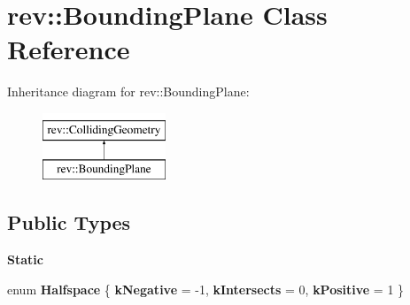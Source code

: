 \hypertarget{classrev_1_1_bounding_plane}{}\section{rev\+::Bounding\+Plane Class Reference}
\label{classrev_1_1_bounding_plane}
Inheritance diagram for rev\+::Bounding\+Plane\+:\begin{figure}[H]
\begin{center}
\leavevmode
\includegraphics[height=2.000000cm]{classrev_1_1_bounding_plane}
\end{center}
\end{figure}
\subsection*{Public Types}
\begin{Indent}\textbf{ Static}\par
\begin{DoxyCompactItemize}
\item 
\mbox{\label{classrev_1_1_bounding_plane_aa005df9e9cb70dc395cf908e943fb655}} 
enum {\bfseries Halfspace} \{ {\bfseries k\+Negative} = -\/1, 
{\bfseries k\+Intersects} = 0, 
{\bfseries k\+Positive} = 1
 \}
\end{DoxyCompactItemize}
\end{Indent}

